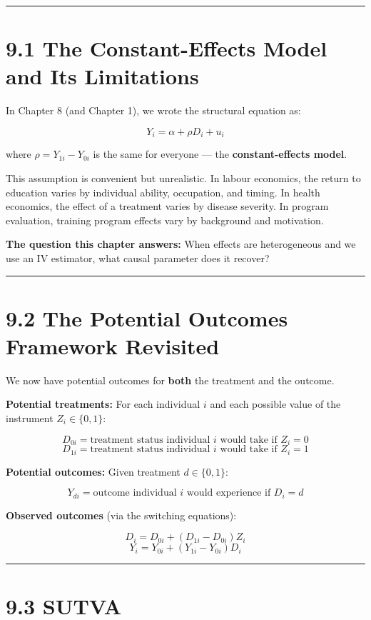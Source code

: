 \medskip\hrule\medskip

\section{9.1 The Constant-Effects Model and Its Limitations}

In Chapter 8 (and Chapter 1), we wrote the structural equation as:

\[
Y_i = \alpha + \rho D_i + u_i
\]

where $\rho = Y_{1i} - Y_{0i}$ is the same for everyone --- the \textbf{constant-effects model}.

This assumption is convenient but unrealistic. In labour economics, the return to education varies by individual ability, occupation, and timing. In health economics, the effect of a treatment varies by disease severity. In program evaluation, training program effects vary by background and motivation.

\textbf{The question this chapter answers:} When effects are heterogeneous and we use an IV estimator, what causal parameter does it recover?

\medskip\hrule\medskip

\section{9.2 The Potential Outcomes Framework Revisited}

We now have potential outcomes for \textbf{both} the treatment and the outcome.

\textbf{Potential treatments:} For each individual $i$ and each possible value of the instrument $Z_i \in \{0,1\}$:

\[
D_{0i} = \text{treatment status individual } i \text{ would take if } Z_i = 0
\]
\[
D_{1i} = \text{treatment status individual } i \text{ would take if } Z_i = 1
\]

\textbf{Potential outcomes:} Given treatment $d \in \{0,1\}$:

\[
Y_{di} = \text{outcome individual } i \text{ would experience if } D_i = d
\]

\textbf{Observed outcomes} (via the switching equations):

\[
D_i = D_{0i} + (D_{1i} - D_{0i})Z_i
\]
\[
Y_i = Y_{0i} + (Y_{1i} - Y_{0i})D_i
\]

\medskip\hrule\medskip

\section{9.3 SUTVA}


